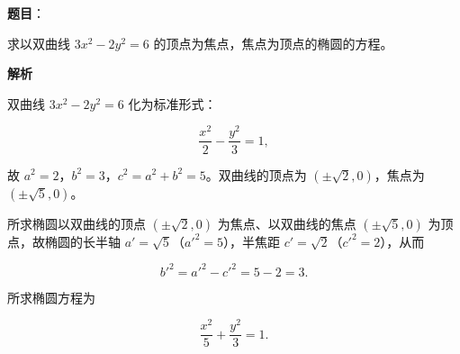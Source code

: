 \begin{answer}

\textbf{题目}：

求以双曲线 $3x^2-2y^2=6$ 的顶点为焦点，焦点为顶点的椭圆的方程。

\textbf{解析}

双曲线 $3x^2-2y^2=6$ 化为标准形式：

\nopagebreak[4]
\[
\frac{x^2}2-\frac{y^2}3=1,
\]

故 $a^2=2$，$b^2=3$，$c^2=a^2+b^2=5$。双曲线的顶点为 $(\pm\sqrt2,0)$，焦点为 $(\pm\sqrt5,0)$。

所求椭圆以双曲线的顶点 $(\pm\sqrt2,0)$ 为焦点、以双曲线的焦点 $(\pm\sqrt5,0)$ 为顶点，故椭圆的长半轴 $a'=\sqrt5$（$a'^2=5$），半焦距 $c'=\sqrt2$（$c'^2=2$），从而

\nopagebreak[4]
\[
b'^2=a'^2-c'^2=5-2=3.
\]

所求椭圆方程为

\nopagebreak[4]
\[
\frac{x^2}5+\frac{y^2}3=1.
\]


\end{answer}
